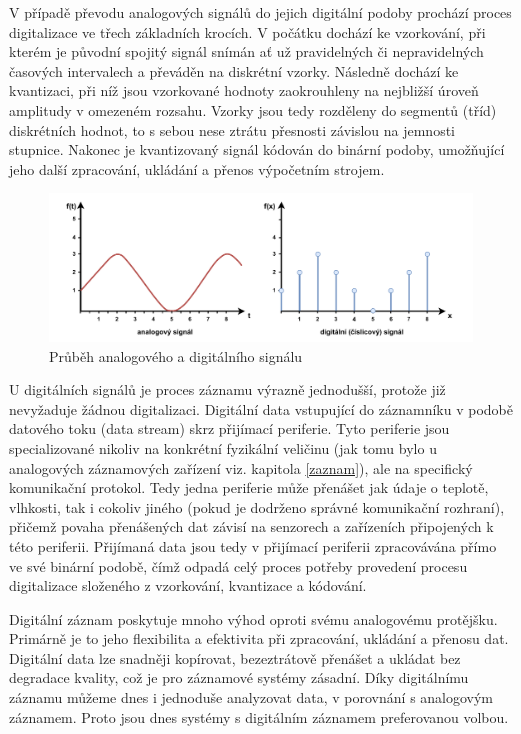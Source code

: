 V případě převodu analogových signálů do jejich digitální podoby prochází proces digitalizace ve třech základních krocích. V počátku dochází ke vzorkování, při kterém je původní spojitý signál snímán ať už pravidelných či nepravidelných časových intervalech a převáděn na diskrétní vzorky. Následně dochází ke kvantizaci, při níž jsou vzorkované hodnoty zaokrouhleny na nejbližší úroveň amplitudy v omezeném rozsahu. Vzorky jsou tedy rozděleny do segmentů (tříd) diskrétních hodnot, to s sebou nese ztrátu přesnosti závislou na jemnosti stupnice. Nakonec je kvantizovaný signál kódován do binární podoby, umožňující jeho další zpracování, ukládání a přenos výpočetním strojem.

\begin{figure}[h]
    \centering
    \includegraphics[width=1.00\textwidth]{obrazky-figures/digital_vs_analog.pdf}
    \caption{Průběh analogového a digitálního signálu}
    \label{fig:digital-vs-analog}
\end{figure}

U digitálních signálů je proces záznamu výrazně jednodušší, protože již nevyžaduje žádnou digitalizaci. Digitální data vstupující do záznamníku v podobě datového toku (data stream) skrz přijímací periferie. Tyto periferie jsou specializované nikoliv na konkrétní fyzikální veličinu (jak tomu bylo u analogových záznamových zařízení viz. kapitola \ref{zaznam}), ale na specifický komunikační protokol. Tedy jedna periferie může přenášet jak údaje o teplotě, vlhkosti, tak i cokoliv jiného (pokud je dodrženo správné komunikační rozhraní), přičemž povaha přenášených dat závisí na senzorech a zařízeních připojených k této periferii. Přijímaná data jsou tedy v přijímací periferii zpracovávána přímo ve své binární podobě, čímž odpadá celý proces potřeby provedení procesu digitalizace složeného z vzorkování, kvantizace a kódování. 

\newpage

Digitální záznam poskytuje mnoho výhod oproti svému analogovému protějšku. Primárně je to jeho flexibilita a efektivita při zpracování, ukládání a přenosu dat. Digitální data lze snadněji kopírovat, bezeztrátově přenášet a ukládat bez degradace kvality, což je pro záznamové systémy zásadní. Díky digitálnímu záznamu můžeme dnes i jednoduše analyzovat data, v porovnání s analogovým záznamem. Proto jsou dnes systémy s digitálním záznamem preferovanou volbou.

